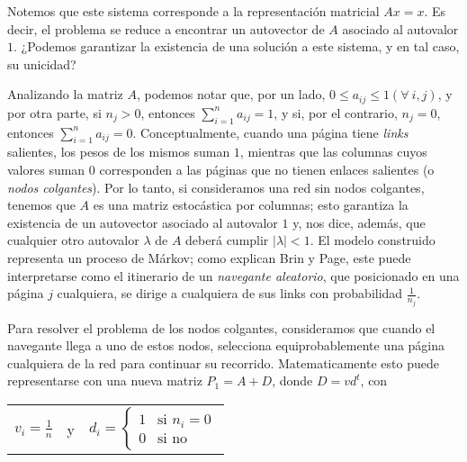         Notemos que este sistema corresponde a la representación matricial $Ax = x$. Es decir, el problema se reduce a encontrar un autovector de $A$ asociado al autovalor $1$. ¿Podemos garantizar la existencia de una solución a este sistema, y en tal caso, su unicidad?

        Analizando la matriz $A$, podemos notar que, por un lado, $0 \leq a_{ij} \leq 1 (\forall\ i, j)$, y por otra parte, si $n_j > 0$, entonces $\sum_{i=1}^{n} a_{ij} = 1$, y si, por el contrario, $n_j = 0$, entonces $\sum_{i=1}^{n} a_{ij} = 0$. Conceptualmente, cuando una página tiene \emph{links} salientes, los pesos de los mismos suman $1$, mientras que las columnas cuyos valores suman $0$ corresponden a las páginas que no tienen enlaces salientes (o \emph{nodos colgantes}). Por lo tanto, si consideramos una red sin nodos colgantes, tenemos que $A$ es una matriz estocástica por columnas; esto garantiza la existencia de un autovector asociado al autovalor $1$ y, nos dice, además, que cualquier otro autovalor $\lambda$ de $A$ deberá cumplir $|\lambda| < 1$. El modelo construido representa un proceso de Márkov; como explican Brin y Page, este puede interpretarse como el itinerario de un \emph{navegante aleatorio}, que posicionado en una página $j$ cualquiera, se dirige a cualquiera de sus links con probabilidad $\frac{1}{n_j}$.

        Para resolver el problema de los nodos colgantes, consideramos que cuando el navegante llega a uno de estos nodos, selecciona equiprobablemente una página cualquiera de la red para continuar su recorrido. Matematicamente esto puede representarse con una nueva matriz $P_1 = A + D$, donde $D = v d^t$, con

        \begin{center}\begin{tabular}{ccc}
            $\displaystyle v_i = \frac{1}{n}$ & \qquad y & \qquad $d_i = \begin{cases} 1 & \text{si }n_i = 0 \\ 0 & \text{si no} \end{cases}$
        \end{tabular}\end{center}


